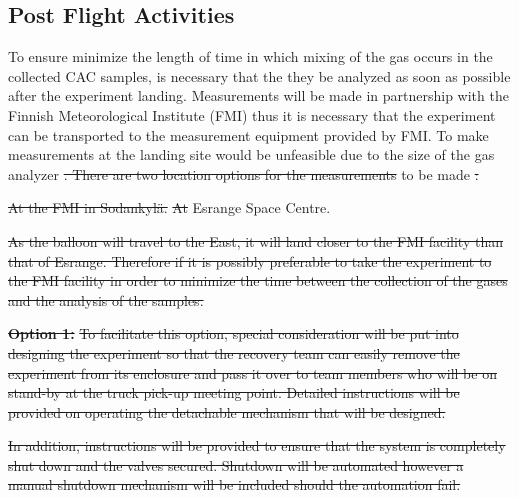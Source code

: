 \documentclass[a4paper,12pt,twoside]{article}
\providecommand{\DIFaddtex}[1]{{\protect\color{blue}\uwave{#1}}} %
\providecommand{\DIFdeltex}[1]{{\protect\color{red}\sout{#1}}}                      %
\providecommand{\DIFaddbegin}{} %
\providecommand{\DIFaddend}{} %
\providecommand{\DIFdelbegin}{} %
\providecommand{\DIFdelend}{} %
\providecommand{\DIFadd}[1]{\texorpdfstring{\DIFaddtex{#1}}{#1}} %
\providecommand{\DIFdel}[1]{\texorpdfstring{\DIFdeltex{#1}}{}} %
\newcommand{\DIFscaledelfig}{0.5}
\newlength{\DIFdelgraphicswidth} %
\newlength{\DIFdelgraphicsheight} %
\newcommand{\DIFaddincludegraphics}[2][]{{\color{blue}\fbox{\DIFOincludegraphics[#1]{#2}}}} %
\newcommand{\DIFdelincludegraphics}[2][]{%
\sbox{\DIFdelgraphicsbox}{\DIFOincludegraphics[#1]{#2}}%
\settoboxwidth{\DIFdelgraphicswidth}{\DIFdelgraphicsbox} %
\settoboxtotalheight{\DIFdelgraphicsheight}{\DIFdelgraphicsbox} %
\scalebox{\DIFscaledelfig}{%
\parbox[b]{\DIFdelgraphicswidth}{\usebox{\DIFdelgraphicsbox}\\[-\baselineskip] \rule{\DIFdelgraphicswidth}{0em}}\llap{\resizebox{\DIFdelgraphicswidth}{\DIFdelgraphicsheight}{%
\setlength{\unitlength}{\DIFdelgraphicswidth}%
\begin{picture}(1,1)%
\thicklines\linethickness{2pt} %
{\color[rgb]{1,0,0}\put(0,0){\framebox(1,1){}}}%
{\color[rgb]{1,0,0}\put(0,0){\line( 1,1){1}}}%
{\color[rgb]{1,0,0}\put(0,1){\line(1,-1){1}}}%
\end{picture}%
}\hspace*{3pt}}} %
} %
\DeclareRobustCommand{\DIFaddbegin}{\DIFOaddbegin \let\includegraphics\DIFaddincludegraphics} %
\DeclareRobustCommand{\DIFaddend}{\DIFOaddend \let\includegraphics\DIFOincludegraphics} %
\DeclareRobustCommand{\DIFdelbegin}{\DIFOdelbegin \let\includegraphics\DIFdelincludegraphics} %
\DeclareRobustCommand{\DIFdelend}{\DIFOaddend \let\includegraphics\DIFOincludegraphics} %
\begin{document}
\subsection{Post Flight Activities}

To ensure minimize the length of time in which mixing of the gas occurs in the collected CAC samples, is necessary that the they  be analyzed as soon as possible after the experiment landing. Measurements will be made in partnership with the Finnish Meteorological Institute (FMI) thus it is necessary that the experiment can be transported to the measurement equipment provided by FMI. To make measurements at the landing site would be unfeasible due to the size of the gas analyzer \DIFdelbegin \DIFdel{. There are two location options for the measurements }\DIFdelend \DIFaddbegin \DIFadd{hence measurements are }\DIFaddend to be made \DIFdelbegin \DIFdel{:
}%

\DIFdel{At the FMI in Sodankylä.
    }%
\DIFdel{At }\DIFdelend \DIFaddbegin \DIFadd{at the }\DIFaddend Esrange Space Centre.
\DIFdelbegin %
\DIFdelend 

\DIFdelbegin \DIFdel{As the balloon will travel to the East, it will land closer to the FMI facility than that of Esrange. Therefore if it is possibly preferable to take the experiment to the FMI facility in order to minimize the time between the collection of the gases and the analysis of the samples. 
}%

\textbf{\DIFdel{Option 1:}}
\DIFdel{To facilitate this option, special consideration will be put into designing the experiment so that the recovery team can easily remove the experiment from its enclosure and pass it over to team members who will be on stand-by at the truck pick-up meeting point. Detailed instructions will be provided on operating the detachable mechanism that will be designed. 
}%

\DIFdel{In addition, instructions will be provided to ensure that the system is completely shut down and the valves secured. Shutdown will be automated however a manual shutdown mechanism will be included should the automation fail.
}%
\end{document}
